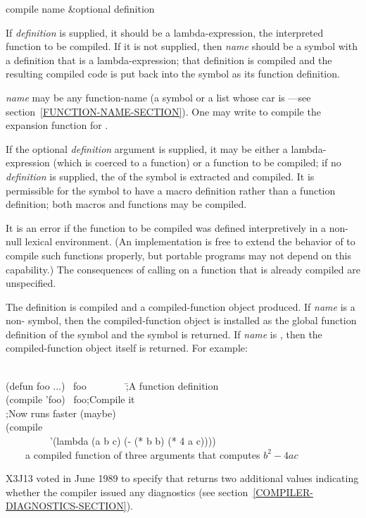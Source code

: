 \begin{defun}[Function]
compile name &optional definition

\begin{obsolete}\noindent
If \emph{definition} is supplied, it should be a lambda-expression,
the interpreted function to be compiled.  If it is not supplied,
then \emph{name} should be a symbol with a definition that is a
lambda-expression; that definition is compiled
and the resulting compiled code is put back into the symbol
as its function definition.
\end{obsolete}

\emph{name} may be any function-name (a symbol or a list
whose car is ---see section~\ref{FUNCTION-NAME-SECTION}).
One may write  to compile the 
expansion function for .

If the optional \emph{definition} argument is supplied,
it may be either a lambda-expression (which is coerced to a function)
or a function to be compiled; if no \emph{definition} is supplied,
the  of the symbol is extracted and compiled.
It is permissible for the symbol to have a macro definition rather than
a function definition; both macros and functions may be compiled.

It is an error if the function to be compiled was defined interpretively
in a non-null lexical environment.  (An implementation is free to extend
the behavior of  to compile such functions properly, but
portable programs may not depend on this capability.)  The consequences
of calling  on a function that is already compiled
are unspecified.

\begin{obsolete}
The definition is compiled and a compiled-function object produced.
If \emph{name} is a non-{\nil}
symbol, then the compiled-function object is installed as the
global function definition of the symbol and the symbol is returned.
If \emph{name} is {\false}, then the compiled-function object itself is returned.
For example:
\begin{lisp}
\\
(defun foo ...) \EV\ foo~~~~~~~~\=;\textrm{A function definition} \\
(compile 'foo) \EV\ foo\>;\textrm{Compile it} \\
\>;\textrm{Now  runs faster (maybe)} \\[4pt]
(compile {\false} \\
~~~~~~~~~'(lambda (a b c) (- (* b b) (* 4 a c)))) \\
~~~\EV\ \textrm{a compiled function of three arguments that computes $b^2-4ac$}
\end{lisp}
\end{obsolete}

\begin{newer}
X3J13 voted in June 1989  to specify that
 returns two additional values
indicating whether the compiler issued any diagnostics
(see section~\ref{COMPILER-DIAGNOSTICS-SECTION}).
\end{newer}
\end{defun}

